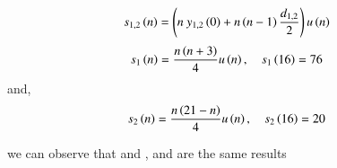 \documentclass[beamer]{IEEEtran}
\theoremstyle{remark}
\begin{document}
\begin{align}
    s_{1,2}\left(n\right)&=\left(n\ y_{1,2}\left(0\right) + n\left(n-1\right)\frac{d_{1,2}}{2}\right)u\left(n\right)
\end{align}
\begin{align}
\label{39}
    s_1\left(n\right)&=\frac{n\left(n+3\right)}{4}u\left(n\right),\quad s_1\left(16\right)=76
\end{align}
and,
\begin{align}
\label{40}
    s_2\left(n\right)&=\frac{n\left(21-n\right)}{4}u\left(n\right),\quad s_2\left(16\right)=20
\end{align}

we can observe that \brak{\ref{11}} and \brak{\ref{39}},\brak{\ref{12}} and \brak{\ref{40}} are the same results
\end{document}
